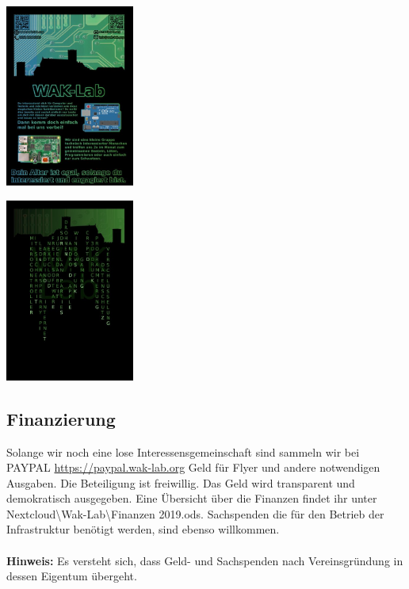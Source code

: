 \ \\
\begin{minipage}[t]{0.5\textwidth}
  \centering
  \includegraphics[height=6cm]{pictures/FlyerMitPlatine.jpg}
  \label{img:FlyerMitPlatine}
\end{minipage}
\begin{minipage}[t]{0.5\textwidth}
  \centering
  \includegraphics[height=6cm]{pictures/FlyerRueckseite.jpg}
  \label{img:FlyerRueckseite}
\end{minipage}

\subsection{Finanzierung}
Solange wir noch eine lose Interessensgemeinschaft sind sammeln wir bei PAYPAL \url{https://paypal.wak-lab.org} Geld für Flyer und andere notwendigen Ausgaben. Die Beteiligung ist freiwillig. Das Geld wird transparent und demokratisch ausgegeben. Eine Übersicht über die Finanzen findet ihr unter Nextcloud\textbackslash Wak-Lab\textbackslash Finanzen 2019.ods. Sachspenden die für den Betrieb der Infrastruktur benötigt werden, sind ebenso willkommen. \\
\ \\
\textbf{Hinweis:} Es versteht sich, dass Geld- und Sachspenden nach Vereinsgründung in dessen Eigentum übergeht.\\

